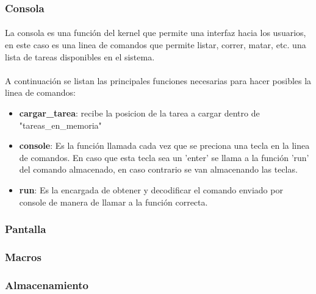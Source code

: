 \documentclass[11pt, a4paper]{article}
\begin{document}
\subsubsection{Consola}
\paragraph{}
La consola es una función del kernel que permite una interfaz hacia los usuarios, en este caso es una linea de comandos que permite listar, correr, matar, etc. una lista de tareas disponibles en el sistema. 
\paragraph{}
A continuación se listan las principales funciones necesarias para hacer posibles la linea de comandos:
\begin{itemize}

\item \textbf{ cargar\_tarea}: recibe la posicion de la tarea a cargar dentro de "tareas\_en\_memoria"

\item \textbf{console}: Es la función llamada cada vez que se preciona una tecla en la linea de comandos. En caso que esta tecla sea un 'enter' se llama a la función 'run' del comando almacenado, en caso contrario se van almacenando las teclas.
\item \textbf{run}: Es la encargada de obtener y decodificar el comando enviado por console de manera de llamar a la función correcta.



\end{itemize}				




\subsubsection{Pantalla}
\subsubsection{Macros}
\subsubsection{Almacenamiento}
\end{document}
